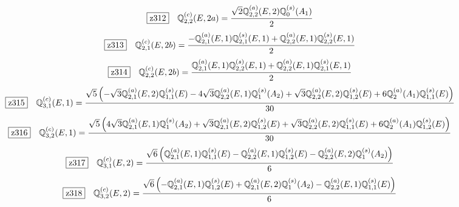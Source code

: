 \documentclass[fleqn,10pt,landscape]{jsarticle}
\begin{document}
\begin{dmath*}
\hspace*{3mm}\fbox{z312}\quad \mathbb{Q}_{2,2}^{(c)}(E,2a)=\frac{\sqrt{2} \mathbb{Q}_{2,2}^{(a)}(E,2) \mathbb{Q}_{0}^{(s)}(A_{1})}{2}
\end{dmath*}
\begin{dmath*}
\hspace*{3mm}\fbox{z313}\quad \mathbb{Q}_{2,1}^{(c)}(E,2b)=\frac{- \mathbb{Q}_{2,1}^{(a)}(E,1) \mathbb{Q}_{2,1}^{(s)}(E,1) + \mathbb{Q}_{2,2}^{(a)}(E,1) \mathbb{Q}_{2,2}^{(s)}(E,1)}{2}
\end{dmath*}
\begin{dmath*}
\hspace*{3mm}\fbox{z314}\quad \mathbb{Q}_{2,2}^{(c)}(E,2b)=\frac{\mathbb{Q}_{2,1}^{(a)}(E,1) \mathbb{Q}_{2,2}^{(s)}(E,1) + \mathbb{Q}_{2,2}^{(a)}(E,1) \mathbb{Q}_{2,1}^{(s)}(E,1)}{2}
\end{dmath*}
\begin{dmath*}
\hspace*{3mm}\fbox{z315}\quad \mathbb{Q}_{3,1}^{(c)}(E,1)=\frac{\sqrt{5} \left(- \sqrt{3} \mathbb{Q}_{2,1}^{(a)}(E,2) \mathbb{Q}_{1,1}^{(s)}(E) - 4 \sqrt{3} \mathbb{Q}_{2,2}^{(a)}(E,1) \mathbb{Q}_{1}^{(s)}(A_{2}) + \sqrt{3} \mathbb{Q}_{2,2}^{(a)}(E,2) \mathbb{Q}_{1,2}^{(s)}(E) + 6 \mathbb{Q}_{2}^{(a)}(A_{1}) \mathbb{Q}_{1,1}^{(s)}(E)\right)}{30}
\end{dmath*}
\begin{dmath*}
\hspace*{3mm}\fbox{z316}\quad \mathbb{Q}_{3,2}^{(c)}(E,1)=\frac{\sqrt{5} \left(4 \sqrt{3} \mathbb{Q}_{2,1}^{(a)}(E,1) \mathbb{Q}_{1}^{(s)}(A_{2}) + \sqrt{3} \mathbb{Q}_{2,1}^{(a)}(E,2) \mathbb{Q}_{1,2}^{(s)}(E) + \sqrt{3} \mathbb{Q}_{2,2}^{(a)}(E,2) \mathbb{Q}_{1,1}^{(s)}(E) + 6 \mathbb{Q}_{2}^{(a)}(A_{1}) \mathbb{Q}_{1,2}^{(s)}(E)\right)}{30}
\end{dmath*}
\begin{dmath*}
\hspace*{3mm}\fbox{z317}\quad \mathbb{Q}_{3,1}^{(c)}(E,2)=\frac{\sqrt{6} \left(\mathbb{Q}_{2,1}^{(a)}(E,1) \mathbb{Q}_{1,1}^{(s)}(E) - \mathbb{Q}_{2,2}^{(a)}(E,1) \mathbb{Q}_{1,2}^{(s)}(E) - \mathbb{Q}_{2,2}^{(a)}(E,2) \mathbb{Q}_{1}^{(s)}(A_{2})\right)}{6}
\end{dmath*}
\begin{dmath*}
\hspace*{3mm}\fbox{z318}\quad \mathbb{Q}_{3,2}^{(c)}(E,2)=\frac{\sqrt{6} \left(- \mathbb{Q}_{2,1}^{(a)}(E,1) \mathbb{Q}_{1,2}^{(s)}(E) + \mathbb{Q}_{2,1}^{(a)}(E,2) \mathbb{Q}_{1}^{(s)}(A_{2}) - \mathbb{Q}_{2,2}^{(a)}(E,1) \mathbb{Q}_{1,1}^{(s)}(E)\right)}{6}
\end{dmath*}
\end{document}
